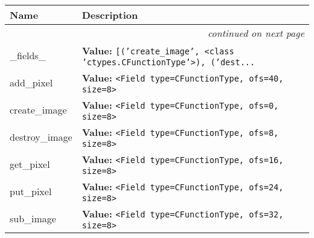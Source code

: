     \vspace{-1cm}
\hspace{\varindent}\begin{longtable}{|p{\varnamewidth}|p{\vardescrwidth}|l}
\cline{1-2}
\cline{1-2} \centering \textbf{Name} & \centering \textbf{Description}& \\
\cline{1-2}
\endhead\cline{1-2}\multicolumn{3}{r}{\small\textit{continued on next page}}\\\endfoot\cline{1-2}
\endlastfoot\raggedright \_\-f\-i\-e\-l\-d\-s\-\_\- & \raggedright \textbf{Value:} 
{\tt \texttt{[}\texttt{(}\texttt{'}\texttt{create\_image}\texttt{'}\texttt{, }{\textless}class 'ctypes.CFunctionType'{\textgreater}\texttt{)}\texttt{, }\texttt{(}\texttt{'}\texttt{dest}\texttt{...}}&\\
\cline{1-2}
\raggedright a\-d\-d\-\_\-p\-i\-x\-e\-l\- & \raggedright \textbf{Value:} 
{\tt {\textless}Field type=CFunctionType, ofs=40, size=8{\textgreater}}&\\
\cline{1-2}
\raggedright c\-r\-e\-a\-t\-e\-\_\-i\-m\-a\-g\-e\- & \raggedright \textbf{Value:} 
{\tt {\textless}Field type=CFunctionType, ofs=0, size=8{\textgreater}}&\\
\cline{1-2}
\raggedright d\-e\-s\-t\-r\-o\-y\-\_\-i\-m\-a\-g\-e\- & \raggedright \textbf{Value:} 
{\tt {\textless}Field type=CFunctionType, ofs=8, size=8{\textgreater}}&\\
\cline{1-2}
\raggedright g\-e\-t\-\_\-p\-i\-x\-e\-l\- & \raggedright \textbf{Value:} 
{\tt {\textless}Field type=CFunctionType, ofs=16, size=8{\textgreater}}&\\
\cline{1-2}
\raggedright p\-u\-t\-\_\-p\-i\-x\-e\-l\- & \raggedright \textbf{Value:} 
{\tt {\textless}Field type=CFunctionType, ofs=24, size=8{\textgreater}}&\\
\cline{1-2}
\raggedright s\-u\-b\-\_\-i\-m\-a\-g\-e\- & \raggedright \textbf{Value:} 
{\tt {\textless}Field type=CFunctionType, ofs=32, size=8{\textgreater}}&\\
\cline{1-2}
\end{longtable}

